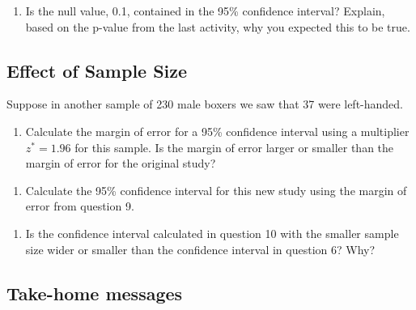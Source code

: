 \documentclass[
]{report}
\providecommand{\tightlist}{%
  \setlength{\itemsep}{0pt}\setlength{\parskip}{0pt}}
\begin{document}
\vspace{1in}

\begin{enumerate}
\def\labelenumi{\arabic{enumi}.}
\setcounter{enumi}{7}
\tightlist
\item
  Is the null value, 0.1, contained in the 95\% confidence interval? Explain, based on the p-value from the last activity, why you expected this to be true.
\end{enumerate}

\hypertarget{effect-of-sample-size}{%
\subsection{Effect of Sample Size}\label{effect-of-sample-size}}

Suppose in another sample of 230 male boxers we saw that 37 were left-handed.

\begin{enumerate}
\def\labelenumi{\arabic{enumi}.}
\setcounter{enumi}{8}
\tightlist
\item
  Calculate the margin of error for a 95\% confidence interval using a multiplier \(z^* = 1.96\) for this sample. Is the margin of error larger or smaller than the margin of error for the original study?
\end{enumerate}

\vspace{0.5in}

\begin{enumerate}
\def\labelenumi{\arabic{enumi}.}
\setcounter{enumi}{9}
\tightlist
\item
  Calculate the 95\% confidence interval for this new study using the margin of error from question 9.
\end{enumerate}

\vspace{0.5in}

\begin{enumerate}
\def\labelenumi{\arabic{enumi}.}
\setcounter{enumi}{10}
\tightlist
\item
  Is the confidence interval calculated in question 10 with the smaller sample size wider or smaller than the confidence interval in question 6? Why?
\end{enumerate}

\hypertarget{take-home-messages-12}{%
\subsection{Take-home messages}\label{take-home-messages-12}}
\end{document}
